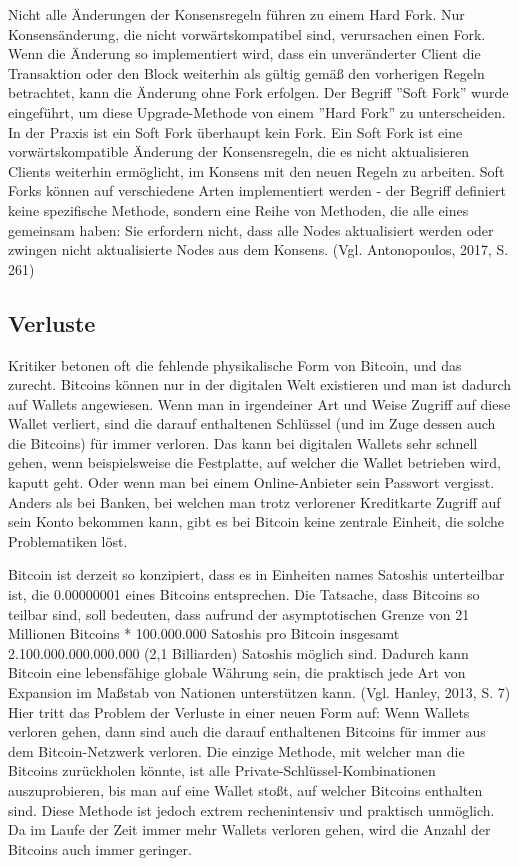 Nicht alle Änderungen der Konsensregeln führen zu einem Hard Fork. Nur Konsensänderung, die nicht vorwärtskompatibel sind,
verursachen einen Fork. Wenn die Änderung so implementiert wird, dass ein unveränderter Client die Transaktion oder den
Block weiterhin als gültig gemäß den vorherigen Regeln betrachtet, kann die Änderung ohne Fork erfolgen. Der Begriff
''Soft Fork'' wurde eingeführt, um diese Upgrade-Methode von einem ''Hard Fork'' zu unterscheiden. In der Praxis ist ein Soft
Fork überhaupt kein Fork. Ein Soft Fork ist eine vorwärtskompatible Änderung der Konsensregeln, die es nicht aktualisieren
Clients weiterhin ermöglicht, im Konsens mit den neuen Regeln zu arbeiten. Soft Forks können auf verschiedene Arten implementiert
werden - der Begriff definiert keine spezifische Methode, sondern eine Reihe von Methoden, die alle eines gemeinsam haben: Sie
erfordern nicht, dass alle Nodes aktualisiert werden oder zwingen nicht aktualisierte Nodes aus dem Konsens. (Vgl. Antonopoulos,
2017, S. 261)

\subsection{Verluste}
Kritiker betonen oft die fehlende physikalische Form von Bitcoin, und das zurecht. Bitcoins können nur in der digitalen Welt
existieren und man ist dadurch auf Wallets angewiesen. Wenn man in irgendeiner Art und Weise Zugriff auf diese Wallet verliert,
sind die darauf enthaltenen Schlüssel (und im Zuge dessen auch die Bitcoins) für immer verloren. Das kann bei digitalen Wallets 
sehr schnell gehen, wenn beispielsweise
die Festplatte, auf welcher die Wallet betrieben wird, kaputt geht. Oder wenn man bei einem Online-Anbieter sein Passwort
vergisst. Anders als bei Banken, bei welchen man trotz verlorener Kreditkarte Zugriff auf sein Konto bekommen kann, gibt es 
bei Bitcoin keine zentrale Einheit, die solche Problematiken löst.

Bitcoin ist derzeit so konzipiert, dass es in Einheiten names Satoshis unterteilbar ist, die 0.00000001 eines Bitcoins
entsprechen. Die Tatsache, dass Bitcoins so teilbar sind, soll bedeuten, dass aufrund der asymptotischen Grenze von 21
Millionen Bitcoins * 100.000.000 Satoshis pro Bitcoin insgesamt 2.100.000.000.000.000 (2,1 Billiarden) Satoshis möglich sind.
Dadurch kann Bitcoin eine lebensfähige globale Währung sein, die praktisch jede Art von Expansion im Maßstab von Nationen 
unterstützen kann. (Vgl. Hanley, 2013, S. 7)
Hier tritt das Problem der Verluste in einer neuen Form auf: Wenn Wallets verloren gehen, dann sind auch die 
darauf enthaltenen Bitcoins für immer aus dem Bitcoin-Netzwerk verloren. Die einzige Methode, mit welcher man die Bitcoins
zurückholen könnte, ist alle Private-Schlüssel-Kombinationen auszuprobieren, bis man auf eine Wallet stoßt, auf welcher Bitcoins
enthalten sind. Diese Methode ist jedoch extrem rechenintensiv und praktisch unmöglich. Da im Laufe der Zeit immer mehr Wallets
verloren gehen, wird die Anzahl der Bitcoins auch immer geringer.